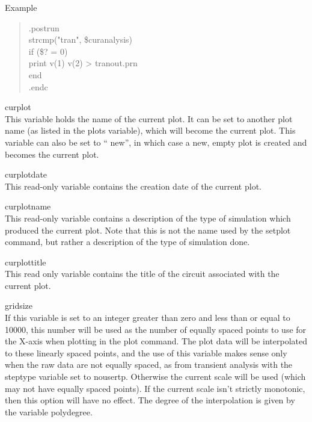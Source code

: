 \begin{description}
Example
\begin{quote}\vt
.postrun\\
strcmp("tran", \$curanalysis)\\
if (\$? = 0)\\
\hspace*{2em}print v(1) v(2) > tranout.prn\\
end\\
.endc
\end{quote}

\item{\et curplot}\\
This variable holds the name of the current plot.  It can be set to
another plot name (as listed in the {\et plots} variable), which will
become the current plot.  This variable can also be set to ``{\vt
new}'', in which case a new, empty plot is created and becomes the
current plot.

\item{\et curplotdate}\\
This read-only variable contains the creation date of the current
plot.

\item{\et curplotname}\\
This read-only variable contains a description of the type of
simulation which produced the current plot.  Note that this is not the
name used by the {\cb setplot} command, but rather a description of
the type of simulation done.

\item{\et curplottitle}\\
This read only variable contains the title of the circuit associated
with the current plot.

\item{\et gridsize}\\
If this variable is set to an integer greater than zero and less than
or equal to 10000, this number will be used as the number of equally
spaced points to use for the X-axis when plotting in the {\cb plot}
command.  The plot data will be interpolated to these linearly spaced
points, and the use of this variable makes sense only when the raw
data are not equally spaced, as from transient analysis with the {\et
steptype} variable set to {\vt nousertp}.  Otherwise the current scale
will be used (which may not have equally spaced points).  If the
current scale isn't strictly monotonic, then this option will have no
effect.  The degree of the interpolation is given by the variable {\et
polydegree}.


\end{description}
